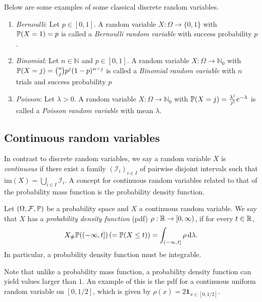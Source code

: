 Below are some examples of some classical discrete random variables.

\begin{example}\hfill
\begin{enumerate}[label=(\alph*)]
\item \textit{Bernoulli}: Let $p \in [0,1]$. A random variable $X : \Omega \to \{0,1\}$ with $\mathbb P(X = 1) = p$ is called a \emph{Bernoulli random variable} with success probability $p$.
\item \textit{Binomial}: Let $n \in \mathbb{N}$ and $p \in [0,1]$. A random variable $X : \Omega \to \mathbb{N}_0$ with $\mathbb P(X = j) = \binom{n}{j} p^j (1-p)^{n-j}$ is called a \emph{Binomial random variable} with $n$ trials and success probability $p$
\item \textit{Poisson}: Let $\lambda > 0$. A random variable $X : \Omega \to \mathbb{N}_0$ with $\mathbb P(X = j) = \frac{\lambda^j}{j!} e^{-\lambda}$ is called a \emph{Poisson random variable} with mean $\lambda$.
\end{enumerate}
\end{example}

\subsection{Continuous random variables}

In contrast to discrete random variables, we say a random variable $X$ is \emph{continuous} if there exist a family  $(\mathcal{I}_i)_{i \in I}$ of pairwise disjoint intervals such that $\mathrm{im}(X) = \bigcup_{i \in I} \mathcal{I}_i$.
A concept for continuous random variables related to that of the probability mass function is the probability density function. 

\begin{definition}\label{def:pdf}
Let $(\Omega, \mathcal F, \mathbb{P})$ be a probability space and $X$ a continuous random variable. We say that $X$ has a \emph{probability density function} (pdf) $\rho : \mathbb R \to [0,\infty)$, if for every $t \in \mathbb R$,
\[
	X_\# \mathbb P((-\infty , t]) \, (= \mathbb P(X \le t)) = \int_{(-\infty,t]} \rho \, \mathrm{d} \lambda.
\]
In particular, a probability density function must be integrable.
\end{definition}

Note that unlike a probability mass function, a probability density function can yield values larger than $1$. An example of this is the pdf for a continuous uniform random variable on $[0,1/2]$, which is given by $\rho(x) = 2 \mathbf{1}_{x \in [0,1/2]}$.

